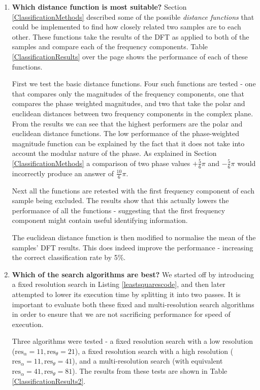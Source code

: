\begin{enumerate}
	\item \textbf{Which distance function is most suitable?}
		Section \ref{ClassificationMethods} described some of the possible \emph{distance functions} that could be implemented to find how closely related two samples are to each other.
		These functions take the results of the DFT as applied to both of the samples and compare each of the frequency components.
		Table \ref{ClassificationResults} over the page shows the performance of each of these functions.
		
		First we test the basic distance functions.
		Four such functions are tested - one that compares only the magnitudes of the frequency components, one that compares the phase weighted magnitudes, and two that take the polar and euclidean distances between two frequency components in the complex plane.
		From the results we can see that the highest performers are the polar and euclidean distance functions.
		The low performance of the phase-weighted magnitude function can be explained by the fact that it does not take into account the modular nature of the phase.
		As explained in Section \ref{ClassificationMethods} a comparison of two phase values $+\frac{5}{6}\pi$ and $-\frac{5}{6}\pi$ would incorrectly produce an answer of $\frac{10}{6}\pi$.
		
		Next all the functions are retested with the first frequency component of each sample being excluded.
		The results show that this actually lowers the performance of all the functions - suggesting that the first frequency component might contain useful identifying information.
		
		The euclidean distance function is then modified to normalise the mean of the samples' DFT results.
		This does indeed improve the performance - increasing the correct classification rate by 5\%.
	
	\item \textbf{Which of the search algorithms are best?}
		We started off by introducing a fixed resolution search in Listing \ref{leastsquarescode}, and then later attempted to lower its execution time by splitting it into two passes.
		It is important to evaluate both these fixed and multi-resolution search algorithms in order to ensure that we are not sacrificing performance for speed of execution.
		
		Three algorithms were tested - a fixed resolution search with a low resolution ($\text{res}_\alpha = 11, \text{res}_\theta = 21$),
		a fixed resolution search with a high resolution ($\text{res}_\alpha = 11, \text{res}_\theta = 41$),
		and a multi-resolution search (with equivalent $\text{res}_\alpha = 41, \text{res}_\theta = 81$).
		The results from these tests are shown in Table \ref{ClassificationResults2}.
		

\end{enumerate}
